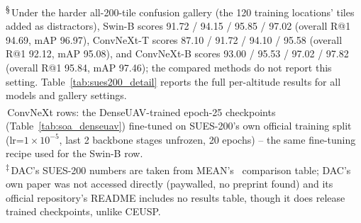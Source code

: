 \documentclass[conference]{IEEEtran}
\begin{document}
\begin{table}[htbp]
\smallskip
\raggedright\footnotesize
\textsuperscript{\S}\,Under the harder all-200-tile confusion gallery (the 120
training locations' tiles added as distractors), Swin-B scores 91.72 / 94.15 /
95.85 / 97.02 (overall R@1 94.69, mAP 96.97), ConvNeXt-T scores 87.10 /
91.72 / 94.10 / 95.58 (overall R@1 92.12, mAP 95.08), and ConvNeXt-B scores
93.00 / 95.53 / 97.02 / 97.82 (overall R@1 95.84, mAP 97.46); the compared
methods do not report this setting. Table~\ref{tab:sues200_detail} reports
the full per-altitude results for all models and gallery settings.\\
\textsuperscript{\dag}\,ConvNeXt rows: the DenseUAV-trained epoch-25
checkpoints (Table~\ref{tab:soa_denseuav}) fine-tuned on SUES-200's own
official training split (lr=$1\times10^{-5}$, last 2 backbone stages
unfrozen, 20 epochs) -- the same fine-tuning recipe used for the Swin-B row.\\
\textsuperscript{$\ddagger$}\,DAC's SUES-200 numbers are taken from
MEAN's~\cite{chen2025mean} comparison table; DAC's own paper was not
accessed directly (paywalled, no preprint found) and its official
repository's README includes no results table, though it does release
trained checkpoints, unlike CEUSP.
\end{table}
\end{document}
